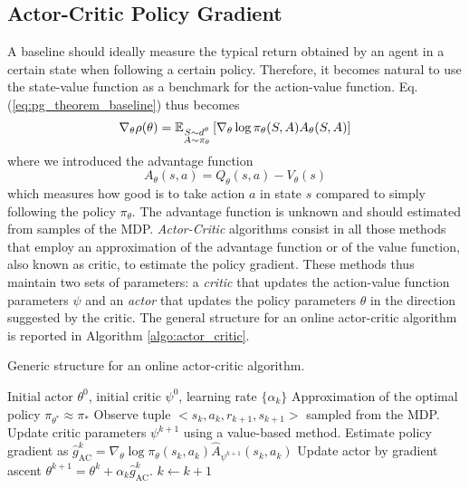 \subsection{Actor-Critic Policy Gradient}
A baseline should ideally measure the typical return obtained by an agent in a certain state when following a certain policy. Therefore, it becomes natural to use the state-value function as a benchmark for the action-value function. Eq. (\ref{eq:pg_theorem_baseline}) thus becomes
\begin{equation}
\label{eq:actor_critic_pg}
	\nabla_\theta \rho(\theta) =
		\E[\substack{S \sim d^\theta\\A \sim \pi_\theta}]{\nabla_\theta\log
		\pi_\theta(S,A) A_\theta(S,A)}
\end{equation} 
where we introduced the advantage function
\begin{equation}
	A_\theta(s,a) = Q_\theta(s,a) - V_\theta(s)
\end{equation}
which measures how good is to take action $a$ in state $s$ compared to simply following the policy $\pi_\theta$. The advantage function is unknown and should estimated from samples of the MDP. \emph{Actor-Critic} algorithms consist in all those methods that employ an approximation of the advantage function or of the value function, also known as critic, to estimate the policy gradient. These methods thus maintain two sets of parameters: a \emph{critic} that updates the action-value function parameters $\psi$ and an \emph{actor} that updates the policy parameters $\theta$ in the direction suggested by the critic. The general structure for an online actor-critic algorithm is reported in Algorithm \ref{algo:actor_critic}.\\
\begin{algorithm}[t]
	\caption{Generic structure for an online actor-critic algorithm.}
	\label{algo:actor_critic}
	\begin{algorithmic}[1]
		\Require Initial actor $\theta^0$, initial critic $\psi^0$, learning rate $\{\alpha_k\}$
		\Ensure Approximation of the optimal policy $\pi_{\theta^*} \approx \pi_*$
		\Repeat
			\State Observe tuple $<s_k, a_k, r_{k+1}, s_{k+1}>$ sampled from the MDP.
			\State Update critic parameters $\psi^{k+1}$ using a value-based method. 
			\State Estimate policy gradient as $\widehat{g}_\text{AC}^k = \nabla_\theta \log \pi_\theta(s_k, a_k) \widehat{A}_{\psi^{k+1}}(s_k, a_k)$
			\State Update actor by gradient ascent $\theta^{k+1} = \theta^k + \alpha_k \widehat{g}_\text{AC}^k$. 
			\State $k \leftarrow k + 1$
	\end{algorithmic}
\end{algorithm}
